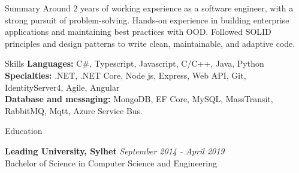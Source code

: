 \documentclass{resume}
\begin{document}

\begin{rSection}{Summary}
Around 2 years of working experience as a software engineer, with a strong pursuit of problem-solving.
Hands-on experience in building enterprise applications and maintaining best practices with OOD.
Followed SOLID principles and design patterns to write clean, maintainable, and adaptive code.
\end{rSection}


\begin{rSection}{Skills}
{\bf Languages:} C\#, Typescript, Javascript, C/C++, Java, Python\\
{\bf Specialties:} .NET, .NET Core, Node js, Express, Web API, Git, IdentityServer4, Agile, Angular\\
{\bf Database and messaging:} MongoDB, EF Core, MySQL, MassTransit, RabbitMQ, Mqtt, Azure Service Bus.
\end{rSection}


\begin{rSection}{Education}

{\bf Leading University, Sylhet} \hfill {\em September 2014 - April 2019}
\\ Bachelor of Science in Computer Science and Engineering
\end{rSection}

\end{document}
